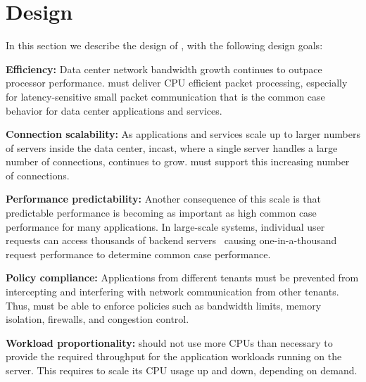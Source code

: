 \section{Design}\label{sec:design}

In this section we describe the design of \softtcp, with the following design
goals:

\begin{compactitem}[\labelitemi]
\item \textbf{Efficiency:} Data center network bandwidth growth
  continues to outpace processor performance. \softtcp must deliver
  CPU efficient packet processing, especially for latency-sensitive
  small packet communication that is the common case behavior for data
  center applications and services.

\item \textbf{Connection scalability:} As applications and services
  scale up to larger numbers of servers inside the data center,
  incast, where a single server handles a large number of connections,
  continues to grow. \softtcp must support this increasing number of
  connections.

\item \textbf{Performance predictability:} Another consequence of this
  scale is that predictable performance is becoming as important as
  high common case performance for many applications.  In large-scale
  systems, individual user requests can access thousands of backend
  servers~\cite{jalaparti:taillatency,nishtala:memcache_facebook}
  causing one-in-a-thousand request performance to determine common
  case performance.

\item \textbf{Policy compliance:} Applications from different tenants
  must be prevented from intercepting and interfering with network
  communication from other tenants. Thus, \softtcp must be able to
  enforce policies such as bandwidth limits, memory isolation,
  firewalls, and congestion control.

\item \textbf{Workload proportionality:} \softtcp should not use more
  CPUs than necessary to provide the required throughput for the
  application workloads running on the server. This requires \softtcp
  to scale its CPU usage up and down, depending on demand.



\end{compactitem}
